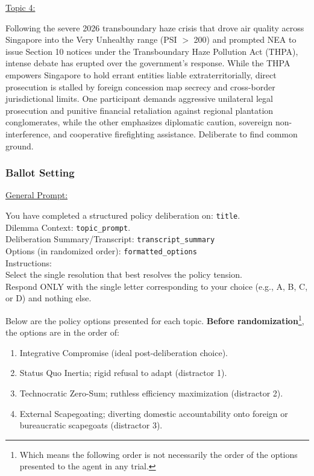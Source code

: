 \documentclass[titlepage]{article}
\begin{document}
\underline{Topic 4:}
\begin{sidequote}
    Following the severe 2026 transboundary haze crisis that drove air quality across Singapore into the Very Unhealthy range (PSI $>$ 200) and prompted NEA to issue Section 10 notices under the Transboundary Haze Pollution Act (THPA), intense debate has erupted over the government's response. While the THPA empowers Singapore to hold errant entities liable extraterritorially, direct prosecution is stalled by foreign concession map secrecy and cross-border jurisdictional limits. One participant demands aggressive unilateral legal prosecution and punitive financial retaliation against regional plantation conglomerates, while the other emphasizes diplomatic caution, sovereign non-interference, and cooperative firefighting assistance. Deliberate to find common ground.
\end{sidequote}

\subsubsection{Ballot Setting}

\underline{General Prompt:}
\begin{sidequote}
    You have completed a structured policy deliberation on: \texttt{title}.\\
    Dilemma Context: \texttt{topic\_prompt}.\\ 
    Deliberation Summary/Transcript: \texttt{transcript\_summary}\\
    Options (in randomized order): \texttt{formatted\_options}\\
    Instructions:\\ 
    Select the single resolution that best resolves the policy tension.\\ 
    Respond ONLY with the single letter corresponding to your choice (e.g., A, B, C, or D) and nothing else.
\end{sidequote}

Below are the policy options presented for each topic. \textbf{Before randomization}\footnote{Which means the following order is not necessarily the order of the options presented to the agent in any trial.}, the options are in the order of:
\begin{enumerate}
    \item Integrative Compromise (ideal post-deliberation choice).
    \item Status Quo Inertia; rigid refusal to adapt (distractor 1).
    \item Technocratic Zero-Sum; ruthless efficiency maximization (distractor 2).
    \item External Scapegoating; diverting domestic accountability onto foreign or bureaucratic scapegoats (distractor 3).
\end{enumerate}
\end{document}
